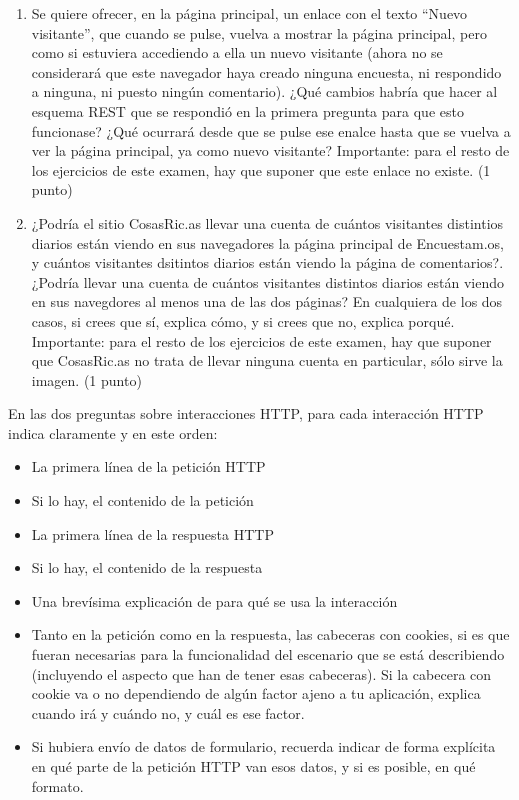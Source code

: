 \begin{enumerate}
\item Se quiere ofrecer, en la página principal, un enlace con el texto ``Nuevo visitante'', que cuando se pulse, vuelva a mostrar la página principal, pero como si estuviera accediendo a ella un nuevo visitante (ahora no se considerará que este navegador haya creado ninguna encuesta, ni respondido a ninguna, ni puesto ningún comentario). ¿Qué cambios habría que hacer al esquema REST que se respondió en la primera pregunta para que esto funcionase? ¿Qué ocurrará desde que se pulse ese enalce hasta que se vuelva a ver la página principal, ya como nuevo visitante? Importante: para el resto de los ejercicios de este examen, hay que suponer que este enlace no existe. (1 punto)

\item ¿Podría el sitio CosasRic.as llevar una cuenta de cuántos visitantes distintios diarios están viendo en sus navegadores la página principal de Encuestam.os, y cuántos visitantes dsitintos diarios están viendo la página de comentarios?. ¿Podría llevar una cuenta de cuántos visitantes distintos diarios están viendo en sus navegdores al menos una de las dos páginas? En cualquiera de los dos casos, si crees que sí, explica cómo, y si crees que no, explica porqué. Importante: para el resto de los ejercicios de este examen, hay que suponer que CosasRic.as no trata de llevar ninguna cuenta en particular, sólo sirve la imagen. (1 punto)

\end{enumerate}

  En las dos preguntas sobre interacciones HTTP, para cada interacción HTTP indica claramente y en este orden:
  \begin{itemize}
  \item La primera línea de la petición HTTP
  \item Si lo hay, el contenido de la petición
  \item La primera línea de la respuesta HTTP
  \item Si lo hay, el contenido de la respuesta
  \item Una brevísima explicación de para qué se usa la interacción
  \item Tanto en la petición como en la respuesta, las cabeceras con cookies, si es que fueran necesarias para la funcionalidad del escenario que se está describiendo (incluyendo el aspecto que han de tener esas cabeceras). Si la cabecera con cookie va o no dependiendo de algún factor ajeno a tu aplicación, explica cuando irá y cuándo no, y cuál es ese factor.
  \item Si hubiera envío de datos de formulario, recuerda indicar de forma explícita en qué parte de la petición HTTP van esos datos, y si es posible, en qué formato.
  \end{itemize}

